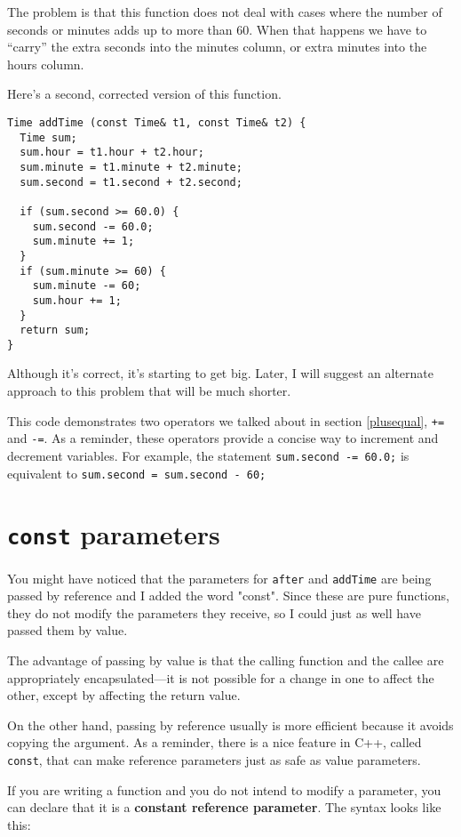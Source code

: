 The problem is that this function does not deal with cases
where the number of seconds or minutes adds up to more than
60.  When that happens we have to ``carry'' the extra seconds
into the minutes column, or extra minutes into the hours
column.

Here's a second, corrected version of this function.

\begin{verbatim}
Time addTime (const Time& t1, const Time& t2) {
  Time sum;
  sum.hour = t1.hour + t2.hour;
  sum.minute = t1.minute + t2.minute;
  sum.second = t1.second + t2.second;

  if (sum.second >= 60.0) {
    sum.second -= 60.0;
    sum.minute += 1;
  }
  if (sum.minute >= 60) {
    sum.minute -= 60;
    sum.hour += 1;
  }
  return sum;
}
\end{verbatim}
%
Although it's correct, it's starting to get big.  Later,
I will suggest an alternate approach to this problem that
will be much shorter.


This code demonstrates two operators we talked about in section \ref{plusequal}, {\tt +=}
and {\tt -=}.  As a reminder, these operators provide a concise way to increment and
decrement variables.  For example, the statement {\tt sum.second -=
60.0;} is equivalent to {\tt sum.second = sum.second - 60;}

\section{{\tt const} parameters}

You might have noticed that the parameters for {\tt after}
and {\tt addTime} are being passed by reference and I added the word "const".  Since
these are pure functions, they do not modify the parameters
they receive, so I could just as well have passed them by
value.

The advantage of passing by value is that the calling function
and the callee are appropriately encapsulated---it is not possible
for a change in one to affect the other, except by affecting
the return value.

On the other hand, passing by reference usually is more efficient
because it avoids copying the argument.  As a reminder, there is a nice
feature in C++, called {\tt const}, that can make reference parameters
just as safe as value parameters.

If you are writing a function and you do not intend to modify a parameter, you can declare that it is a {\bf constant
reference parameter}.  The syntax looks like this:

